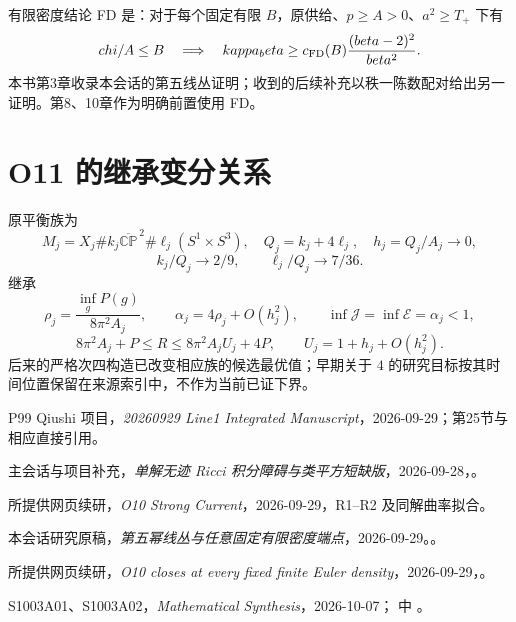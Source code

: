 \documentclass[UTF8,11pt,fontset=none]{ctexart}
\begin{document}
有限密度结论 FD 是：对于每个固定有限 \(B\)，原供给、\(p\ge A>0\)、\(a^2\ge T_+\) 下有 \[
\chi/A\le B\quad\Longrightarrow\quad
\kappa_\beta\ge c_{\rm FD}(B)\frac{(\beta-2)^2}{\beta^2}.
\] 本书第3章收录本会话的第五线丛证明；收到的后续补充以秩一陈数配对给出另一证明。第8、10章作为明确前置使用 FD。\cite{R03,FD}

\section{O11 的继承变分关系}\label{ch0:o11-ux7684ux7ee7ux627fux53d8ux5206ux5173ux7cfb}

原平衡族为 \[
M_j=X_j\#k_j\overline{\mathbb{CP}}^{\,2}
\#\ell_j(S^1\times S^3),\quad
Q_j=k_j+4\ell_j,\quad h_j=Q_j/A_j\to0,
\] \[
k_j/Q_j\to2/9,\qquad\ell_j/Q_j\to7/36.
\] 继承 \[
\rho_j=\frac{\inf_gP(g)}{8\pi^2A_j},\qquad
\alpha_j=4\rho_j+O(h_j^2),\qquad
\inf\mathcal J=\inf\mathcal E=\alpha_j<1,
\] \[
8\pi^2A_j+P\le R\le8\pi^2A_jU_j+4P,
\qquad U_j=1+h_j+O(h_j^2).
\] 后来的严格次四构造已改变相应族的候选最优值；早期关于 \(4\) 的研究目标按其时间位置保留在来源索引中，不作为当前已证下界。\cite{Base,System}

\begin{thebibliography}{P99}
\small
{} Qiushi 项目，\emph{20260929 Line1 Integrated Manuscript}，2026-09-29；第25节与相应直接引用。

 主会话与项目补充，\emph{单解无迹 Ricci 积分障碍与类平方短缺版}，2026-09-28，。

 所提供网页续研，\emph{O10 Strong Current}，2026-09-29，R1--R2 及同解曲率拟合。

 本会话研究原稿，\emph{第五幂线丛与任意固定有限密度端点}，2026-09-29。。

 所提供网页续研，\emph{O10 closes at every fixed finite Euler density}，2026-09-29，。

 S1003A01、S1003A02，\emph{Mathematical Synthesis}，2026-10-07； 中 。

\end{thebibliography}
\end{document}
